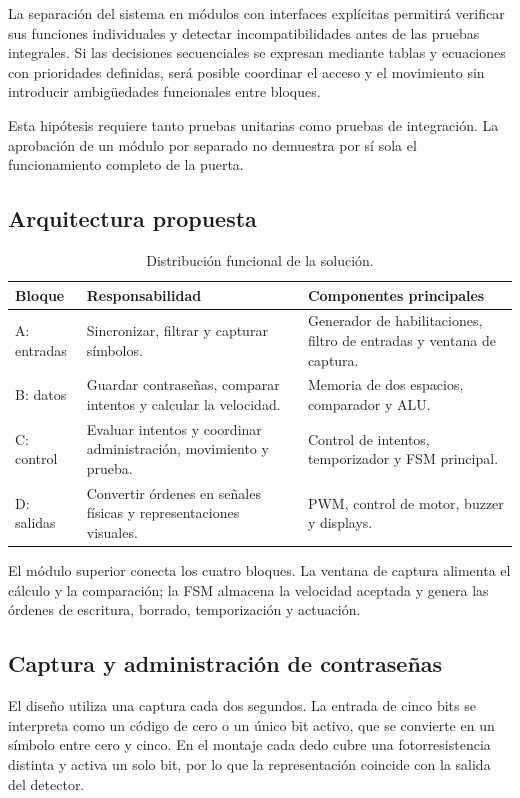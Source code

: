 \documentclass[12pt,letterpaper]{article}
\begin{document}
La separación del sistema en módulos con interfaces
explícitas permitirá verificar sus funciones individuales
y detectar incompatibilidades antes de las pruebas
integrales. Si las decisiones secuenciales se expresan
mediante tablas y ecuaciones con prioridades definidas,
será posible coordinar el acceso y el movimiento sin
introducir ambigüedades funcionales entre bloques.

Esta hipótesis requiere tanto pruebas unitarias como
pruebas de integración. La aprobación de un módulo por
separado no demuestra por sí sola el funcionamiento
completo de la puerta.

\subsection{Arquitectura propuesta}

\begin{table}[H]
\centering
\small
\begin{tabularx}{\textwidth}{@{}p{2cm}YY@{}}
\toprule
Bloque & Responsabilidad & Componentes principales\\
\midrule
A: entradas &
Sincronizar, filtrar y capturar símbolos. &
Generador de habilitaciones, filtro de entradas y
ventana de captura.\\
B: datos &
Guardar contraseñas, comparar intentos y calcular
la velocidad. &
Memoria de dos espacios, comparador y ALU.\\
C: control &
Evaluar intentos y coordinar administración,
movimiento y prueba. &
Control de intentos, temporizador y FSM principal.\\
D: salidas &
Convertir órdenes en señales físicas y
representaciones visuales. &
PWM, control de motor, buzzer y displays.\\
\bottomrule
\end{tabularx}
\caption{Distribución funcional de la solución.}
\end{table}

El módulo superior conecta los cuatro bloques. La ventana
de captura alimenta el cálculo y la comparación; la FSM
almacena la velocidad aceptada y genera las órdenes de
escritura, borrado, temporización y actuación.

\subsection{Captura y administración de contraseñas}

El diseño utiliza una captura cada dos segundos. La
entrada de cinco bits se interpreta como un código de
cero o un único bit activo, que se convierte en un símbolo
entre cero y cinco. En el montaje cada dedo cubre una
fotorresistencia distinta y activa un solo bit, por lo
que la representación coincide con la salida del detector.
\end{document}

